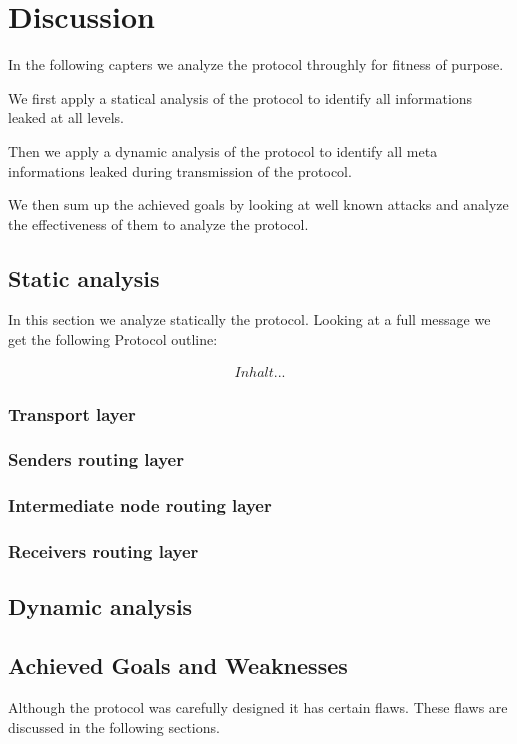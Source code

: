
\part{Discussion \label{sec:discussion}}
In the following capters we analyze the protocol throughly for fitness of purpose. 

We first apply a statical analysis of the protocol to identify all informations leaked at all levels.

Then we apply a dynamic analysis of the protocol to identify all meta informations leaked during transmission of the protocol.

We then sum up the achieved goals by looking at well known attacks and analyze the effectiveness of them to analyze the protocol.

\chapter{Static analysis}
In this section we analyze statically the protocol. Looking at a full message we get the following Protocol outline:

\begin{eqnarray}
Inhalt...
\end{eqnarray}
\section{Transport layer}
\section{Senders routing layer}
\section{Intermediate node routing layer}
\section{Receivers routing layer}

\chapter{Dynamic analysis}

\chapter{Achieved Goals and Weaknesses}
Although the protocol was carefully designed it has certain flaws. These flaws are discussed in the following sections.


